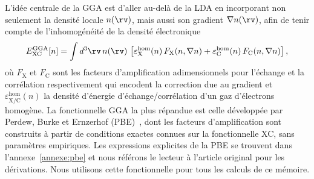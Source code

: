 L'idée centrale de la GGA est d'aller au-delà de la LDA en incorporant non seulement la densité locale $n(\rv)$, mais aussi son gradient $\nabla n(\rv)$, afin de tenir compte de l'inhomogénéité de la densité électronique
\begin{equation}
    E_\text{XC}^\text{GGA}[n]=\int d^3\rv\,n(\rv)\,\left[\varepsilon_\text{X}^\text{hom}(n)\,F_\text{X}(n,\nabla n)+\varepsilon_\text{C}^\text{hom}(n)\,F_\text{C}(n,\nabla n)\right],
\end{equation}
où $F_\text{X}$ et $F_\text{C}$ sont les facteurs d'amplification adimensionnels pour l'échange et la corrélation respectivement qui encodent la correction due au gradient et $\varepsilon_\text{X/C}^\text{hom}(n)$ la densité d'énergie d'échange/corrélation d'un gaz d'électrons homogène. La fonctionnelle GGA la plus répandue est celle développée par Perdew, Burke et Ernzerhof (PBE)~\cite{perdewGeneralizedGradientApproximation1996a}, dont les facteurs d'amplification sont construits à partir de conditions exactes connues sur la fonctionnelle XC, sans paramètres empiriques. Les expressions explicites de la PBE se trouvent dans l'annexe~\ref{annexe:pbe} et nous référons le lecteur à l'article original pour les dérivations. Nous utilisons cette fonctionnelle pour tous les calculs de ce mémoire.

